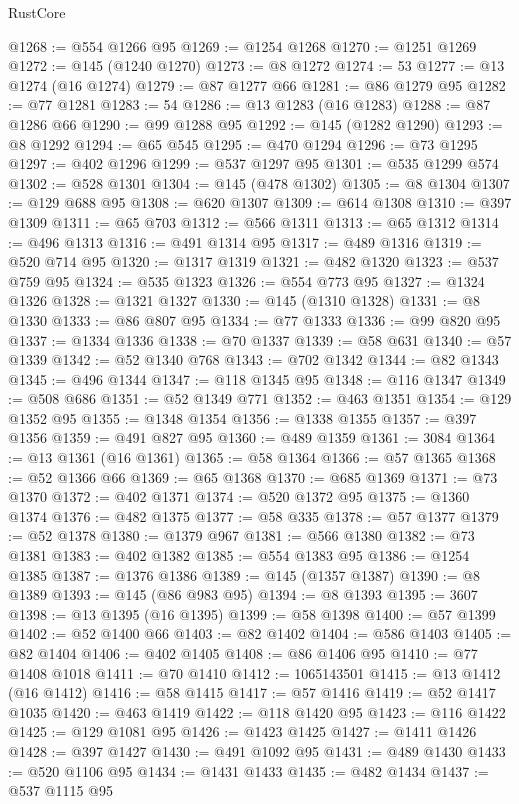 \begin{lexlean}{RustCore}
\begin{coremodule}
@1268 := @554 @1266 @95
@1269 := @1254 @1268
@1270 := @1251 @1269
@1272 := @145 (@1240 @1270)
@1273 := @8 @1272
@1274 := 53
@1277 := @13 @1274 (@16 @1274)
@1279 := @87 @1277 @66
@1281 := @86 @1279 @95
@1282 := @77 @1281
@1283 := 54
@1286 := @13 @1283 (@16 @1283)
@1288 := @87 @1286 @66
@1290 := @99 @1288 @95
@1292 := @145 (@1282 @1290)
@1293 := @8 @1292
@1294 := @65 @545
@1295 := @470 @1294
@1296 := @73 @1295
@1297 := @402 @1296
@1299 := @537 @1297 @95
@1301 := @535 @1299 @574
@1302 := @528 @1301
@1304 := @145 (@478 @1302)
@1305 := @8 @1304
@1307 := @129 @688 @95
@1308 := @620 @1307
@1309 := @614 @1308
@1310 := @397 @1309
@1311 := @65 @703
@1312 := @566 @1311
@1313 := @65 @1312
@1314 := @496 @1313
@1316 := @491 @1314 @95
@1317 := @489 @1316
@1319 := @520 @714 @95
@1320 := @1317 @1319
@1321 := @482 @1320
@1323 := @537 @759 @95
@1324 := @535 @1323
@1326 := @554 @773 @95
@1327 := @1324 @1326
@1328 := @1321 @1327
@1330 := @145 (@1310 @1328)
@1331 := @8 @1330
@1333 := @86 @807 @95
@1334 := @77 @1333
@1336 := @99 @820 @95
@1337 := @1334 @1336
@1338 := @70 @1337
@1339 := @58 @631
@1340 := @57 @1339
@1342 := @52 @1340 @768
@1343 := @702 @1342
@1344 := @82 @1343
@1345 := @496 @1344
@1347 := @118 @1345 @95
@1348 := @116 @1347
@1349 := @508 @686
@1351 := @52 @1349 @771
@1352 := @463 @1351
@1354 := @129 @1352 @95
@1355 := @1348 @1354
@1356 := @1338 @1355
@1357 := @397 @1356
@1359 := @491 @827 @95
@1360 := @489 @1359
@1361 := 3084
@1364 := @13 @1361 (@16 @1361)
@1365 := @58 @1364
@1366 := @57 @1365
@1368 := @52 @1366 @66
@1369 := @65 @1368
@1370 := @685 @1369
@1371 := @73 @1370
@1372 := @402 @1371
@1374 := @520 @1372 @95
@1375 := @1360 @1374
@1376 := @482 @1375
@1377 := @58 @335
@1378 := @57 @1377
@1379 := @52 @1378
@1380 := @1379 @967
@1381 := @566 @1380
@1382 := @73 @1381
@1383 := @402 @1382
@1385 := @554 @1383 @95
@1386 := @1254 @1385
@1387 := @1376 @1386
@1389 := @145 (@1357 @1387)
@1390 := @8 @1389
@1393 := @145 (@86 @983 @95)
@1394 := @8 @1393
@1395 := 3607
@1398 := @13 @1395 (@16 @1395)
@1399 := @58 @1398
@1400 := @57 @1399
@1402 := @52 @1400 @66
@1403 := @82 @1402
@1404 := @586 @1403
@1405 := @82 @1404
@1406 := @402 @1405
@1408 := @86 @1406 @95
@1410 := @77 @1408 @1018
@1411 := @70 @1410
@1412 := 1065143501
@1415 := @13 @1412 (@16 @1412)
@1416 := @58 @1415
@1417 := @57 @1416
@1419 := @52 @1417 @1035
@1420 := @463 @1419
@1422 := @118 @1420 @95
@1423 := @116 @1422
@1425 := @129 @1081 @95
@1426 := @1423 @1425
@1427 := @1411 @1426
@1428 := @397 @1427
@1430 := @491 @1092 @95
@1431 := @489 @1430
@1433 := @520 @1106 @95
@1434 := @1431 @1433
@1435 := @482 @1434
@1437 := @537 @1115 @95

\end{coremodule}
\end{lexlean}
